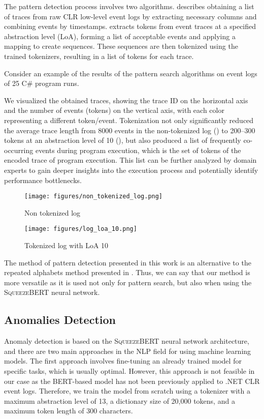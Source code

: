 \documentclass[sigplan,nonacm]{acmart}
\begin{document}
The pattern detection process involves two algorithms.  describes obtaining a list of traces from raw CLR low-level event logs by extracting necessary columns and combining events by timestamps.  extracts tokens from event traces at a specified abstraction level (LoA), forming a list of acceptable events and applying a mapping to create sequences. These sequences are then tokenized using the trained tokenizers, resulting in a list of tokens for each trace.

Consider an example of the results of the pattern search algorithms on event logs of 25 C\# program runs. 

We visualized the obtained traces, showing the trace ID on the horizontal axis and the number of events (tokens) on the vertical axis, with each color representing a different token/event. Tokenization not only significantly reduced the average trace length from 8000 events in the non-tokenized log () to 200–300 tokens at an abstraction level of 10 (), but also produced a list of frequently co-occurring events during program execution, which is the set of tokens of the encoded trace of program execution. This list can be further analyzed by domain experts to gain deeper insights into the execution process and potentially identify performance bottlenecks.

\begin{figure}
\texttt{[image: figures/non\_tokenized\_log.png]}
\caption{Non tokenized log}
\Description{}
\label{fig:non_tokenized_log}
\end{figure}

\begin{figure}
\texttt{[image: figures/log\_loa\_10.png]}
\caption{Tokenized log with LoA 10}
\Description{}
\label{fig:log_loa_10}
\end{figure}

The method of pattern detection presented in this work is an alternative to the repeated alphabets method presented in \cite{stepanov2024extracting}. Thus, we can say that our method is more versatile as it is used not only for pattern search, but also when using the \textsc{SqueezeBERT} neural network.

\subsection{Anomalies Detection}

Anomaly detection is based on the \textsc{SqueezeBERT} neural network architecture, and there are two main approaches in the NLP field for using machine learning models. The first approach involves fine-tuning an already trained model for specific tasks, which is usually optimal. However, this approach is not feasible in our case as the BERT-based model has not been previously applied to .NET CLR event logs. Therefore, we train the model from scratch using a tokenizer with a maximum abstraction level of 13, a dictionary size of 20,000 tokens, and a maximum token length of 300 characters.
\end{document}
